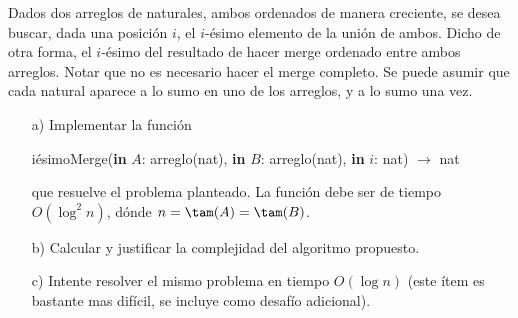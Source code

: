 
Dados dos arreglos de naturales, ambos ordenados de manera
creciente, se desea buscar, dada una posición $i$, el $i$-ésimo elemento de
la unión de ambos. Dicho de otra forma, el $i$-ésimo del resultado
de hacer merge ordenado entre ambos arreglos.
Notar que no es necesario hacer el merge completo.
Se puede asumir que cada natural aparece a lo sumo en uno de los arreglos,
y a lo sumo una vez.

\begin{enumerate}
\item[a)] Implementar la función
\begin{center}
iésimoMerge(\textbf{in} $A$: arreglo(nat), \textbf{in} $B$: arreglo(nat), \textbf{in} $i$: nat) $\to$ nat
\end{center}
que resuelve el problema planteado. 
La función debe ser de tiempo $O(\log^2 n)$, dónde
$n = \tam(A) = \tam(B)$.
\item[b)] Calcular y justificar la complejidad del algoritmo propuesto.
\item[c)] Intente resolver el mismo problema en tiempo $O(\log n)$ (este ítem
es bastante mas difícil, se incluye como desafío adicional).
\end{enumerate}

